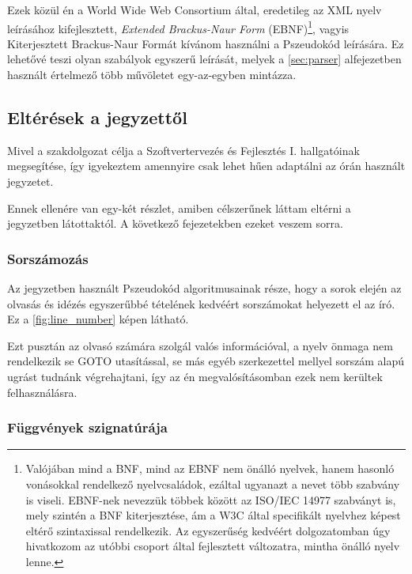 Ezek közül én a World Wide Web Consortium által, eredetileg az XML nyelv leírásához kifejlesztett\cite{w3c}, \textit{Extended Brackus-Naur Form} (EBNF)\footnote{Valójában mind a BNF, mind az EBNF nem önálló nyelvek, hanem hasonló vonásokkal rendelkező nyelvcsaládok, ezáltal ugyanazt a nevet több szabvány is viseli. EBNF-nek nevezzük többek között az ISO/IEC 14977\cite{isoebnf} szabványt is, mely szintén a BNF kiterjesztése, ám a W3C által specifikált nyelvhez képest eltérő szintaxissal rendelkezik. Az egyszerűség kedvéért dolgozatomban úgy hivatkozom az utóbbi csoport által fejlesztett változatra, mintha önálló nyelv lenne.}, vagyis Kiterjesztett Brackus-Naur Formát kívánom használni a Pszeudokód leírására. Ez lehetővé teszi olyan szabályok egyszerű leírását, melyek a \ref{sec:parser} alfejezetben használt értelmező több művöletet egy-az-egyben mintázza.



\subsection{Eltérések a jegyzettől}

Mivel a szakdolgozat célja a Szoftvertervezés és Fejlesztés I. hallgatóinak megsegítése, így igyekeztem amennyire csak lehet hűen adaptálni az órán használt jegyzetet\cite{jegyzet}.

Ennek ellenére van egy-két részlet, amiben célszerűnek láttam eltérni a jegyzetben látottaktól. A következő fejezetekben ezeket veszem sorra.

\subsubsection{Sorszámozás}

Az jegyzetben használt Pszeudokód algoritmusainak része, hogy a sorok elején az olvasás és idézés egyszerűbbé tételének kedvéért sorszámokat helyezett el az író. Ez a \ref{fig:line_number} képen látható.


Ezt pusztán az olvasó számára szolgál valós információval, a nyelv önmaga nem rendelkezik se GOTO utasítással, se más egyéb szerkezettel mellyel sorszám alapú ugrást tudnánk végrehajtani, így az én megvalósításomban ezek nem kerültek felhasználásra.

\subsubsection{Függvények szignatúrája}

